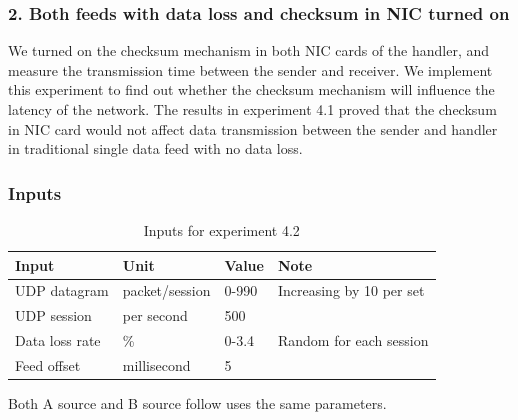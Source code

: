 \documentclass[11pt,openright,a4paper]{report}
\begin{document}
\subsubsection{2. Both feeds with data loss and checksum in NIC turned on}
We turned on the checksum mechanism in both NIC cards of the handler, and measure the transmission time between the sender and receiver. We implement this experiment to find out whether the checksum mechanism will influence the latency of the network. The results in experiment 4.1 proved that the checksum in NIC card would not affect data transmission between the sender and handler in traditional single data feed with no data loss.\\
\subsubsection{Inputs}
\begin{table}[H]
	\centering
	\caption{Inputs for experiment 4.2}
	\label{my-label}
	\begin{tabular}{@{}llll@{}}
		\toprule
		Input          & Unit           & Value  & Note                     \\ \midrule
		UDP datagram   & packet/session & 0-990 & Increasing by 10 per set \\ 
		UDP session    & per second     & 500    & 							\\
		Data loss rate & \%             & 0-3.4  & Random for each session  \\
		Feed offset & millisecond   & 5         &                                \\ \bottomrule
		\end{tabular}
\end{table}
Both A source and B source follow uses the same parameters.\\
\end{document}
